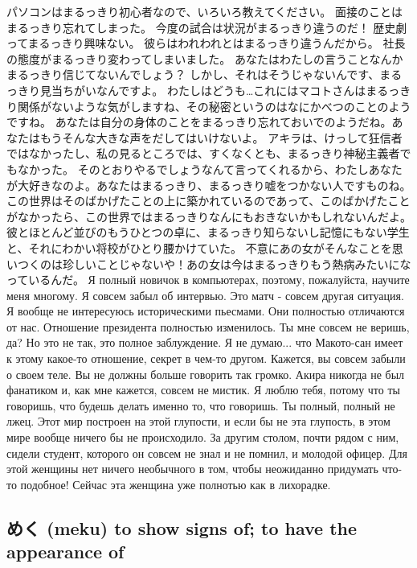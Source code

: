 パソコンはまるっきり初心者なので、いろいろ教えてください。
面接のことはまるっきり忘れてしまった。
今度の試合は状況がまるっきり違うのだ！
歴史劇ってまるっきり興味ない。
彼らはわれわれとはまるっきり違うんだから。
社長の態度がまるっきり変わってしまいました。
あなたはわたしの言うことなんかまるっきり信じてないんでしょう？
しかし、それはそうじゃないんです、まるっきり見当ちがいなんですよ。
わたしはどうも…これにはマコトさんはまるっきり関係がないような気がしますね、その秘密というのはなにかべつのことのようですね。
あなたは自分の身体のことをまるっきり忘れておいでのようだね。あなたはもうそんな大きな声をだしてはいけないよ。
アキラは、けっして狂信者ではなかったし、私の見るところでは、すくなくとも、まるっきり神秘主義者でもなかった。
そのとおりやるでしょうなんて言ってくれるから、わたしあなたが大好きなのよ。あなたはまるっきり、まるっきり嘘をつかない人ですものね。
この世界はそのばかげたことの上に築かれているのであって、このばかげたことがなかったら、この世界ではまるっきりなんにもおきないかもしれないんだよ。
彼とほとんど並びのもうひとつの卓に、まるっきり知らないし記憶にもない学生と、それにわかい将校がひとり腰かけていた。
不意にあの女がそんなことを思いつくのは珍しいことじゃないや！あの女は今はまるっきりもう熱病みたいになっているんだ。
Я полный новичок в компьютерах, поэтому, пожалуйста, научите меня многому.
Я совсем забыл об интервью.
Это матч - совсем другая ситуация.
Я вообще не интересуюсь историческими пьесмами.
Они полностью отличаются от нас.
Отношение президента полностью изменилось.
Ты мне совсем не веришь, да?
Но это не так, это полное заблуждение.
Я не думаю... что Макото-сан имеет к этому какое-то отношение, секрет в чем-то другом.
Кажется, вы совсем забыли о своем теле. Вы не должны больше говорить так громко.
Акира никогда не был фанатиком и, как мне кажется, совсем не мистик.
Я люблю тебя, потому что ты говоришь, что будешь делать именно то, что говоришь. Ты полный, полный не лжец.
Этот мир построен на этой глупости, и если бы не эта глупость, в этом мире вообще ничего бы не происходило.
За другим столом, почти рядом с ним, сидели студент, которого он совсем не знал и не помнил, и молодой офицер.
Для этой женщины нет ничего необычного в том, чтобы неожиданно придумать что-то подобное! Сейчас эта женщина уже полнотью как в лихорадке.

\subsection{めく (meku) to show signs of; to have the appearance of}

